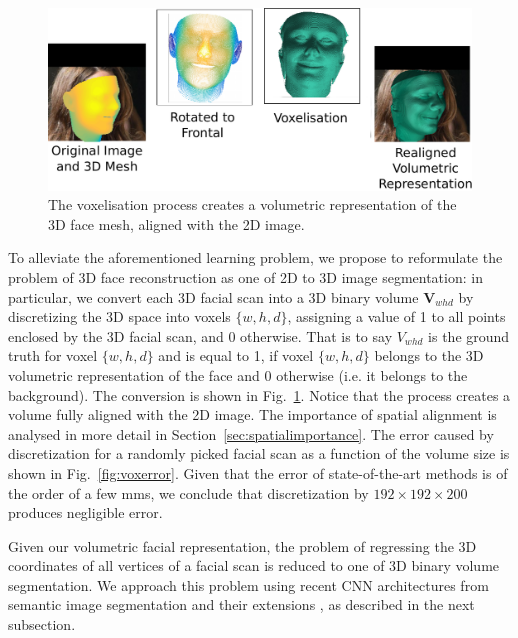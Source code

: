 \begin{figure}
  \centering
  \includegraphics[width=\linewidth]{img/discretisation.pdf}
  \caption{The voxelisation process creates a volumetric representation of the 3D face mesh, aligned with the 2D image.}
  \label{fig:discretisation}
\end{figure}

To alleviate the aforementioned learning problem, we propose to
reformulate the problem of 3D face reconstruction as one of 2D to 3D
image segmentation: in particular, we convert each 3D facial scan into 
a 3D binary volume $\mathbf{V}_{whd}$ by discretizing the 3D space
into voxels $\{w,h,d\}$, assigning a value of 1 to all
points enclosed by the 3D facial scan, and 0 otherwise. That is to say
$ V_{whd}$ is the ground truth for voxel $\{w,h,d\}$ and is equal to
1, if voxel $\{w,h,d\}$ belongs to the 3D volumetric representation of
the face and 0 otherwise (i.e. it belongs to the background). The
conversion is shown in Fig.~\ref{fig:discretisation}. Notice that the process creates a volume fully aligned with the 2D image. The importance of spatial alignment is analysed in more detail in Section~\ref{sec:spatialimportance}. The error caused by
discretization for a randomly picked facial scan as a function of the
volume size is shown in Fig.~\ref{fig:voxerror}. Given that the error of
state-of-the-art methods
\cite{roth2016adaptive,liu2016joint} is of the order of a few mms, we
conclude that discretization by $192\times 192\times 200$ produces negligible
error.

Given our volumetric facial representation, the problem of regressing
the 3D coordinates of all vertices of a facial scan is reduced to one
of 3D binary volume segmentation. We approach this problem using
recent CNN architectures from semantic image segmentation
\cite{long2015fully} and their extensions \cite{newell2016stacked}, as
described in the next subsection.

